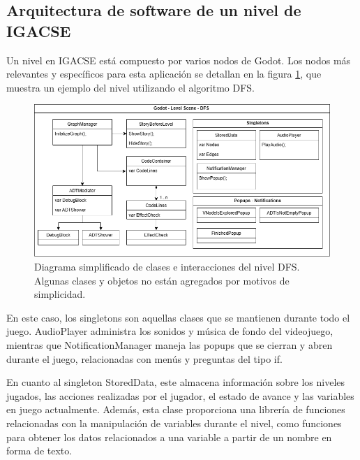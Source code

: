 \subsection{Arquitectura de software de un nivel de IGACSE}


Un nivel en IGACSE está compuesto por varios nodos de Godot. Los nodos más relevantes y específicos para esta aplicación se detallan en la figura \ref{diagram_dfs_level}, que muestra un ejemplo del nivel utilizando el algoritmo DFS.


\begin{figure}[!h]
	\centering
	\includegraphics[scale=.7]{imagenes/level_scene_DFS.png}
	\caption{Diagrama simplificado de clases e interacciones del nivel DFS. Algunas clases y objetos no están agregados por motivos de simplicidad.}
	\label{diagram_dfs_level}
\end{figure}

\restoregeometry

En este caso, los singletons son aquellas clases que se mantienen durante todo el juego. AudioPlayer administra los sonidos y música de fondo del videojuego, mientras que NotificationManager maneja las popups que se cierran y abren durante el juego, relacionadas con menús y preguntas del tipo if.

En cuanto al singleton StoredData, este almacena información sobre los niveles jugados, las acciones realizadas por el jugador, el estado de avance y las variables en juego actualmente. Además, esta clase proporciona una librería de funciones relacionadas con la manipulación de variables durante el nivel, como funciones para obtener los datos relacionados a una variable a partir de un nombre en forma de texto.

